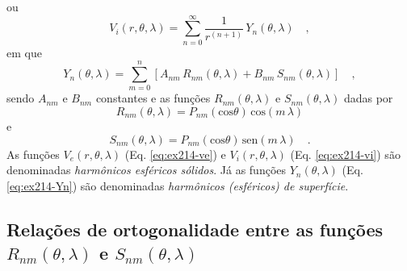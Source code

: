 \documentclass[10pt,a4paper,fleqn]{article}
\begin{document}
ou
\begin{equation}
V_{i}(r,\theta,\lambda) = \sum_{n=0}^{\infty} \frac{1}{r^{(n+1)}} \,
Y_{n}(\theta, \lambda) \quad ,
\label{eq:ex214-vi}
\end{equation}
em que 
\begin{equation}
Y_{n}(\theta, \lambda) = \sum_{m=0}^{n} 
\left[ 
A_{nm} \, R_{nm}(\theta, \lambda) +
B_{nm} \, S_{nm}(\theta, \lambda)
\right] \quad ,
\label{eq:ex214-Yn}
\end{equation}
sendo $A_{nm}$ e $B_{nm}$ constantes e as fun\c{c}\~{o}es $R_{nm}(\theta, \lambda)$ e $S_{nm}(\theta, \lambda)$ dadas por
\begin{equation}
R_{nm}(\theta, \lambda) = P_{nm}(\text{cos}\theta) \, \text{cos}(m \, \lambda)
\label{eq:ex214-rnm}
\end{equation}
e
\begin{equation}
S_{nm}(\theta, \lambda) = P_{nm}(\text{cos}\theta) \, \text{sen}(m \, \lambda) \quad .
\label{eq:ex214-snm}
\end{equation}
As fun\c{c}\~{o}es $V_{e}(r,\theta,\lambda)$ (Eq. \ref{eq:ex214-ve}) e
$V_{i}(r,\theta,\lambda)$ (Eq. \ref{eq:ex214-vi}) s\~{a}o denominadas 
\textit{harm\^{o}nicos esf\'{e}ricos s\'{o}lidos}. Já as fun\c{c}\~{o}es $Y_{n}(\theta, \lambda)$ 
(Eq. \ref{eq:ex214-Yn}) s\~{a}o denominadas \textit{harm\^{o}nicos (esf\'{e}ricos) de superf\'{i}cie}.


\subsection{Rela\c{c}\~{o}es de ortogonalidade entre as fun\c{c}\~{o}es $R_{nm}(\theta, \lambda)$ e $S_{nm}(\theta, \lambda)$}
\end{document}
